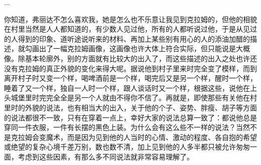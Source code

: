 \documentclass[12pt,a4paper]{article}
\begin{document}
...



你知道，弗丽达不怎么喜欢我，她是怎么也不乐意让我见到克拉姆的，但他的相貌在村里当然是人人都知道的，有少数人见过他，所有的人都听说过他，于是从见过的人得到的印象、道听途说听来的材料、再加上某些别有用心的人的添油加醋的描述，就勾画出了一幅克拉姆画像，这画像也许大体上符合实际，但只能说是大概像。除基本轮廓外，别的方面就有比较大的出入了，而这些描述的出入之处也许还没有克拉姆的真正外貌的变化来得大呢。据说他到村子里来时完全变了模样，而到离开村子时又变一个样，喝啤酒前是一个样，喝完后又是另一个样，醒时一个样，睡着了又一个样，独自一人时一个样，跟人谈话时又一个样，根据这些，说他在上头城堡里时完完全全是另一个人就由不得你不信了。再就是，即使那些有关他在村里时的外貌的说法，也有相当大的出入，关于他的个子、姿势、胖瘦、胡子等方面的说法都很不一致，只有在穿着一点上，幸好大家的说法总算一致了：都说他总是穿同一件衣服，一件有长摆的黑色上装。为什么会有这么些不一样的说法？当然不是克拉姆会变魔术，而是因为见到他的人当时的心情、激动的程度、各自抱的希望或绝望的复杂心境千差万别，数也数不清，加上见到他的人多半都只被允许匆匆一面，考虑到这些因素，有那么多不同说法就非常容易理解了。
\par{}
\end{document}
